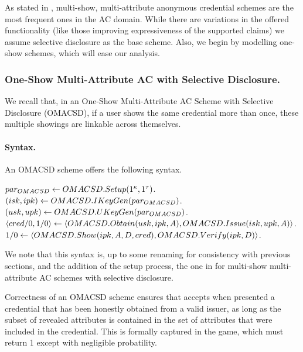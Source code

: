 As stated in , multi-show, multi-attribute anonymous credential
schemes are the most frequent ones in the AC domain. While there are variations
in the offered functionality (like those improving expressiveness of the
supported claims) we assume selective disclosure as the base scheme. Also,
we begin by modelling one-show schemes, which will ease our analysis.

\subsubsection{One-Show Multi-Attribute AC with Selective Disclosure.} %
We recall that, in an One-Show Multi-Attribute AC Scheme with Selective
Disclosure (OMACSD), if a user shows the same credential more than once, these
multiple showings are linkable across themselves. 

\paragraph{Syntax.} %
An OMACSD scheme offers the following syntax.

\begin{description}
\item[$par_{OMACSD} \leftarrow OMACSD.Setup(1^\kappa,1^\tau)$.]
\item[$(isk,ipk) \leftarrow OMACSD.IKeyGen(par_{OMACSD})$.]
\item[$(usk,upk) \leftarrow OMACSD.UKeyGen(par_{OMACSD})$.]
\item[$\langle cred/0, 1/0 \rangle \leftarrow
  \langle OMACSD.Obtain(usk,ipk,A),
  OMACSD.Issue(isk,upk,A) \rangle$.]
\item[$1/0 \leftarrow
  \langle OMACSD.Show(ipk,A,D,cred),
  OMACSD.Verify(ipk,D) \rangle$.]
\end{description}

We note that this syntax is, up to some renaming for consistency with previous
sections, and the addition of the setup process, the one in \cite{fhs19} for
multi-show multi-attribute AC schemes with selective disclosure.

Correctness of an OMACSD scheme ensures that \OMACSDVerify accepts when
presented a credential that has been honestly obtained from a valid issuer, as
long as the subset of revealed attributes \OMACSDdattr is contained in the set
of attributes \OMACSDattr that were included in the credential. This is formally
captured in the \OMACSDExpCorrect game, which must return 1 except with
negligible probatility.

